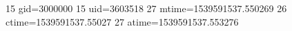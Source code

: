 15 gid=3000000
15 uid=3603518
27 mtime=1539591537.550269
26 ctime=1539591537.55027
27 atime=1539591537.553276
